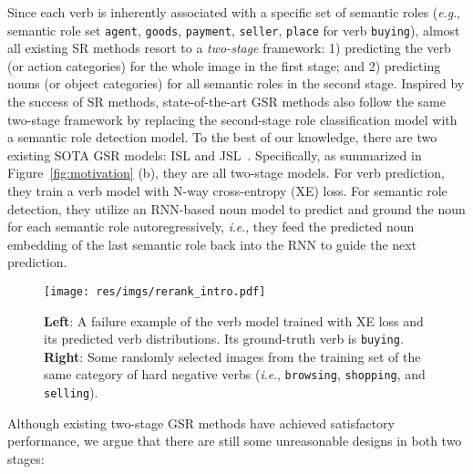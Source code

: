 \documentclass[letterpaper]{article} \usepackage{aaai22}  \usepackage{times}  \usepackage{helvet}  \usepackage{courier}  \usepackage[hyphens]{url}  \usepackage{graphicx} \urlstyle{rm} \def\UrlFont{\rm}  \usepackage{natbib}  \usepackage{caption} \DeclareCaptionStyle{ruled}{labelfont=normalfont,labelsep=colon,strut=off} \frenchspacing  \setlength{\pdfpagewidth}{8.5in}  \setlength{\pdfpageheight}{11in}
\newcommand{\ie}{\textit{i}.\textit{e}.}
\newcommand{\eg}{\textit{e}.\textit{g}.}
\begin{document}
Since each verb is inherently associated with a specific set of semantic roles (\eg, semantic role set \texttt{agent}, \texttt{goods}, \texttt{payment}, \texttt{seller}, \texttt{place} for verb \texttt{buying}), almost all existing SR methods resort to a \emph{two-stage} framework: 1) predicting the verb (or action categories) for the whole image in the first stage; and 2) predicting nouns (or object categories) for all semantic roles in the second stage. Inspired by the success of SR methods, state-of-the-art GSR methods also follow the same two-stage framework by replacing the second-stage role classification model with a semantic role detection model. To the best of our knowledge, there are two existing SOTA GSR models: ISL and JSL~\cite{pratt2020grounded}. Specifically, as summarized in Figure~\ref{fig:motivation} (b), they are all two-stage models. For verb prediction, they train a verb model with N-way cross-entropy (XE) loss. For semantic role detection, they utilize an RNN-based noun model to predict and ground the noun for each semantic role autoregressively, \ie, they feed the predicted noun embedding of the last semantic role back into the RNN to guide the next prediction.


















\begin{figure}[t]
    \centering
    \texttt{[image: res/imgs/rerank\_intro.pdf]}
    \caption{\textbf{Left}: A failure example of the verb model trained with XE loss and its predicted verb distributions. Its ground-truth verb is \texttt{buying}. \textbf{Right}: Some randomly selected images from the training set of the same category of hard negative verbs (\ie, \texttt{browsing}, \texttt{shopping}, and \texttt{selling}).}
    \label{fig:rerank_intro}
\end{figure}


Although existing two-stage GSR methods have achieved satisfactory performance, we argue that there are still some unreasonable designs in both two stages:
\end{document}
